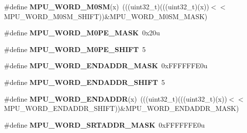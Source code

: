 \begin{DoxyCompactItemize}
\item 
\#define {\bfseries M\+P\+U\+\_\+\+W\+O\+R\+D\+\_\+\+M0\+SM}(x)~(((uint32\+\_\+t)(((uint32\+\_\+t)(x))$<$$<$M\+P\+U\+\_\+\+W\+O\+R\+D\+\_\+\+M0\+S\+M\+\_\+\+S\+H\+I\+FT))\&M\+P\+U\+\_\+\+W\+O\+R\+D\+\_\+\+M0\+S\+M\+\_\+\+M\+A\+SK)\hypertarget{group__MPU__Register__Masks_gacbf1a03a72f3f4a5280f114f39922ae9}{}\label{group__MPU__Register__Masks_gacbf1a03a72f3f4a5280f114f39922ae9}

\item 
\#define {\bfseries M\+P\+U\+\_\+\+W\+O\+R\+D\+\_\+\+M0\+P\+E\+\_\+\+M\+A\+SK}~0x20u\hypertarget{group__MPU__Register__Masks_gaf73ab1ad40c518ff22b6577b70bf99cc}{}\label{group__MPU__Register__Masks_gaf73ab1ad40c518ff22b6577b70bf99cc}

\item 
\#define {\bfseries M\+P\+U\+\_\+\+W\+O\+R\+D\+\_\+\+M0\+P\+E\+\_\+\+S\+H\+I\+FT}~5\hypertarget{group__MPU__Register__Masks_ga7b9c85b27f809d1b74cb271b796f2cb4}{}\label{group__MPU__Register__Masks_ga7b9c85b27f809d1b74cb271b796f2cb4}

\item 
\#define {\bfseries M\+P\+U\+\_\+\+W\+O\+R\+D\+\_\+\+E\+N\+D\+A\+D\+D\+R\+\_\+\+M\+A\+SK}~0x\+F\+F\+F\+F\+F\+F\+E0u\hypertarget{group__MPU__Register__Masks_gad5d1a04b42678bcb2600ef9ee33a97b2}{}\label{group__MPU__Register__Masks_gad5d1a04b42678bcb2600ef9ee33a97b2}

\item 
\#define {\bfseries M\+P\+U\+\_\+\+W\+O\+R\+D\+\_\+\+E\+N\+D\+A\+D\+D\+R\+\_\+\+S\+H\+I\+FT}~5\hypertarget{group__MPU__Register__Masks_ga66676fa259feddcd6fb70b638dd7442e}{}\label{group__MPU__Register__Masks_ga66676fa259feddcd6fb70b638dd7442e}

\item 
\#define {\bfseries M\+P\+U\+\_\+\+W\+O\+R\+D\+\_\+\+E\+N\+D\+A\+D\+DR}(x)~(((uint32\+\_\+t)(((uint32\+\_\+t)(x))$<$$<$M\+P\+U\+\_\+\+W\+O\+R\+D\+\_\+\+E\+N\+D\+A\+D\+D\+R\+\_\+\+S\+H\+I\+FT))\&M\+P\+U\+\_\+\+W\+O\+R\+D\+\_\+\+E\+N\+D\+A\+D\+D\+R\+\_\+\+M\+A\+SK)\hypertarget{group__MPU__Register__Masks_gaa1d540199eab33ae6bb64f891dab8db4}{}\label{group__MPU__Register__Masks_gaa1d540199eab33ae6bb64f891dab8db4}

\item 
\#define {\bfseries M\+P\+U\+\_\+\+W\+O\+R\+D\+\_\+\+S\+R\+T\+A\+D\+D\+R\+\_\+\+M\+A\+SK}~0x\+F\+F\+F\+F\+F\+F\+E0u\hypertarget{group__MPU__Register__Masks_ga99ac4386c2eefb943305a1faec44419c}{}\label{group__MPU__Register__Masks_ga99ac4386c2eefb943305a1faec44419c}


\end{DoxyCompactItemize}
